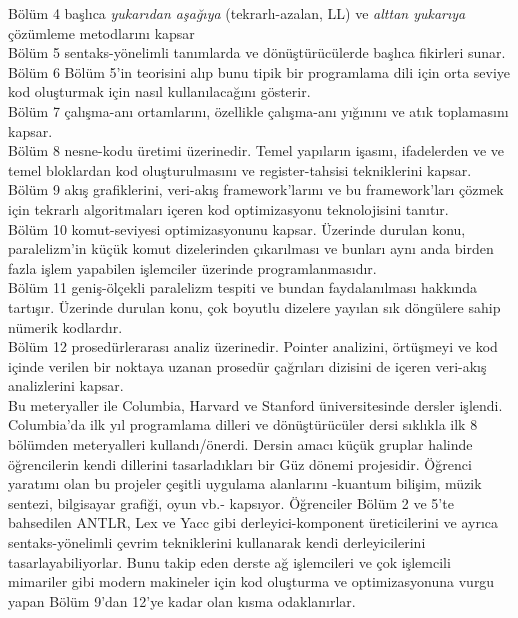\documentclass{book}
\begin{document}
Bölüm 4 başlıca \textit{yukarıdan aşağıya} (tekrarlı-azalan, LL) ve \textit{alttan yukarıya} çözümleme metodlarını kapsar
\\

Bölüm 5 sentaks-yönelimli tanımlarda ve dönüştürücülerde başlıca fikirleri sunar.
\\

Bölüm 6 Bölüm 5'in teorisini alıp bunu tipik bir programlama dili için orta seviye kod oluşturmak için nasıl kullanılacağını gösterir.
\\

Bölüm 7 çalışma-anı ortamlarını, özellikle çalışma-anı yığınını ve atık toplamasını kapsar.
\\

Bölüm 8 nesne-kodu üretimi üzerinedir. Temel yapıların işasını, ifadelerden ve ve temel bloklardan kod oluşturulmasını ve register-tahsisi tekniklerini kapsar.
\\

Bölüm 9 akış grafiklerini, veri-akış framework'larını ve bu framework'ları çözmek için tekrarlı algoritmaları içeren kod optimizasyonu teknolojisini tanıtır.
\\

Bölüm 10 komut-seviyesi optimizasyonunu kapsar. Üzerinde durulan konu, paralelizm'in küçük komut dizelerinden çıkarılması ve bunları aynı anda birden fazla işlem yapabilen işlemciler üzerinde programlanmasıdır.
\\

Bölüm 11 geniş-ölçekli paralelizm tespiti ve bundan faydalanılması hakkında tartışır. Üzerinde durulan konu, çok boyutlu dizelere yayılan sık döngülere sahip nümerik kodlardır.
\\

Bölüm 12 prosedürlerarası analiz üzerinedir. Pointer analizini, örtüşmeyi ve kod içinde verilen bir noktaya uzanan prosedür çağrıları dizisini de içeren veri-akış analizlerini kapsar.
\\

Bu meteryaller ile Columbia, Harvard ve Stanford üniversitesinde dersler işlendi. Columbia'da ilk yıl programlama dilleri ve dönüştürücüler dersi sıklıkla ilk 8 bölümden meteryalleri kullandı/önerdi. Dersin amacı küçük gruplar halinde öğrencilerin kendi dillerini tasarladıkları bir Güz dönemi projesidir. Öğrenci yaratımı olan bu projeler çeşitli uygulama alanlarını -kuantum bilişim, müzik sentezi, bilgisayar grafiği, oyun vb.- kapsıyor. Öğrenciler Bölüm 2 ve 5'te bahsedilen ANTLR, Lex ve Yacc gibi derleyici-komponent üreticilerini ve ayrıca sentaks-yönelimli çevrim tekniklerini kullanarak kendi derleyicilerini tasarlayabiliyorlar. Bunu takip eden derste ağ işlemcileri ve çok işlemcili mimariler gibi modern makineler için kod oluşturma ve optimizasyonuna vurgu yapan   Bölüm 9'dan 12'ye kadar olan kısma odaklanırlar.
\end{document}
